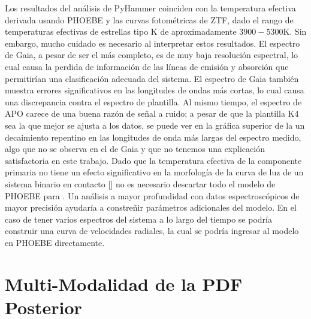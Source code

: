 Los resultados del análisis de PyHammer coinciden con la temperatura efectiva
derivada usando PHOEBE y las curvas fotométricas de ZTF, dado el rango de
temperaturas efectivas de estrellas tipo K de aproximadamente $3900 - 5300
\mathrm{K}$. Sin embargo, mucho cuidado es necesario al interpretar estos
resultados. El espectro de Gaia, a pesar de ser el más completo, es de muy baja
resolución espectral, lo cual causa la perdida de información de las líneas de
emisión y absorción que permitirían una clasificación adecuada del sistema. El
espectro de Gaia también muestra errores significativos en las longitudes de
ondas más cortas, lo cual causa una discrepancia contra el espectro de
plantilla. Al mismo tiempo, el espectro de APO carece de una buena razón de
señal a ruido; a pesar de que la plantilla K4 sea la que mejor se ajusta a los
datos, se puede ver en la gráfica superior de la
 un decaimiento repentino en las longitudes de
onda más largas del espectro medido, algo que no se observa en el de Gaia y que
no tenemos una explicación satisfactoria en este trabajo. Dado que la
temperatura efectiva de la componente primaria no tiene un efecto significativo
en la morfología de la curva de luz de un sistema binario en contacto
[] no
es necesario descartar todo el modelo de PHOEBE para \atoObjIdNoSpace. Un
análisis a mayor profundidad con datos espectroscópicos de mayor precisión
ayudaría a constreñir parámetros adicionales del modelo. En el caso de tener
varios espectros del sistema a lo largo del tiempo se podría construir una curva
de velocidades radiales, la cual se podría ingresar al modelo en PHOEBE
directamente.

\section{Multi-Modalidad de la PDF Posterior}

